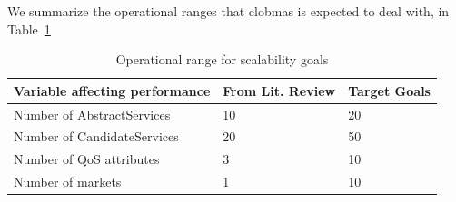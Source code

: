 \documentclass[10pt,journal,compsoc]{IEEEtran}
\begin{document}
We summarize the operational ranges that clobmas is expected to deal with, in Table~\ref{tbl:scalability_targets}
\begin{table}[H]
\centering
\begin{tabular}{p{4cm}p{2.5cm}p{2cm}}
	\toprule
	\textbf{Variable affecting performance} & \textbf{From Lit. Review} & \textbf{Target Goals}\\ 
	\midrule
	Number of AbstractServices & \hspace{0.75cm}10 & \hspace{0.5cm}20 \\ 
	Number of CandidateServices  & \hspace{0.75cm}20 & \hspace{0.5cm}50 \\ 
	Number of QoS attributes & \hspace{0.75cm}3 & \hspace{0.5cm}10 \\ 
	Number of markets & \hspace{0.75cm}1 & \hspace{0.5cm}10 \\ 
	\bottomrule
\end{tabular}
\caption{Operational range for scalability goals \label{tbl:scalability_targets}}
\end{table}
\end{document}
